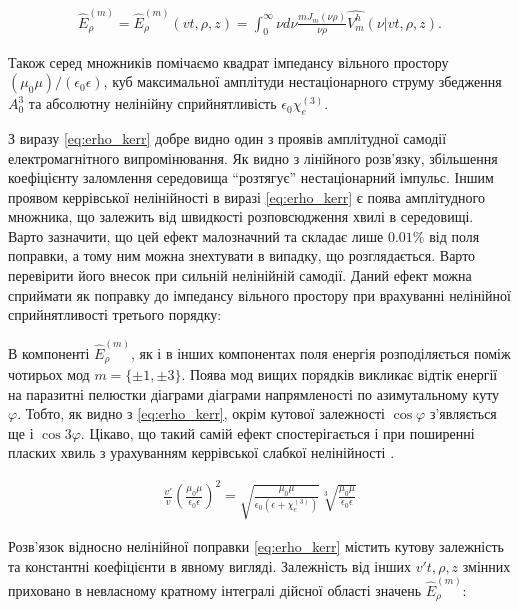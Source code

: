 \begin{equation} \begin{aligned} \label{eq:erho_norm}
\hat{E}_\rho^{(m)} = \hat{E}_\rho^{(m)} (vt,\rho,z) = 
\int_0^\infty \nu d \nu \frac{m J_m(\nu \rho)}{\nu \rho} 
\hat{V_m^h} (\nu | vt,\rho,z).
\end{aligned} \end{equation}

Також серед множників помічаємо квадрат імпедансу вільного простору 
$ (\mu_0 \mu) / (\epsilon_0 \epsilon) $, куб максимальної амплітуди 
нестаціонарного струму збедження $ A_0^3 $ та абсолютну нелінійну 
сприйнятливість $ \epsilon_0 \chi_e^{(3)} $.

З виразу \eqref{eq:erho_kerr} добре видно один з проявів амплітудної
самодії електромагнітного випромінювання. Як видно з лінійного розв'язку,
збільшення коефіцієнту заломлення середовища ``розтягує'' нестаціонарний 
імпульс. Іншим проявом керрівської нелінійності в виразі \eqref{eq:erho_kerr} 
є поява амплітудного множника, що залежить від швидкості розповсюдження 
хвилі в середовищі. Варто зазначити, що цей ефект малозначний та складає 
лише $ 0.01\% $ від поля поправки, а тому ним можна знехтувати в випадку, 
що розглядається. Варто перевірити його внесок при сильній нелінійній 
самодії. Даний ефект можна сприймати як поправку до імпедансу вільного 
простору при врахуванні нелінійної сприйнятливості третього порядку:

В компоненті $ \hat{E}_\rho^{(m)} $, як і в інших компонентах поля енергія 
розподіляється поміж чотирьох мод $ m = \{ \pm 1, \pm 3 \} $. Поява мод вищих 
порядків викликає відтік енергії на паразитні пелюстки діаграми діаграми 
напрямленості по азимутальному куту $ \varphi $. Тобто, як видно з 
\eqref{eq:erho_kerr}, окрім кутової залежності $ \cos \varphi $ з'являється
ще і $ \cos 3 \varphi $. Цікаво, що такий самій ефект спостерігається і при 
поширенні пласких хвиль з урахуванням керрівської слабкої нелінійності 
\cite{imp:Carlogio1985}.

\begin{equation*} \begin{aligned}
\frac{v'}{v}
\left( \frac{\mu_0 \mu}{\epsilon_0 \epsilon} \right)^2 = 
\sqrt{\frac{\mu_0 \mu}{\epsilon_0 \left( \epsilon + \chi_e^{(3)} \right)}}
\sqrt[3]{\frac{\mu_0 \mu}{\epsilon_0 \epsilon}} 
\end{aligned} \end{equation*}

Розв'язок відносно нелінійної поправки \eqref{eq:erho_kerr} містить кутову 
залежність та константні коефіцієнти в явному вигляді. Залежність від інших 
$ v't, \rho, z $ змінних приховано в невласному кратному інтегралі дійсної 
області значень $ \hat{E}_\rho^{(m)} $:


